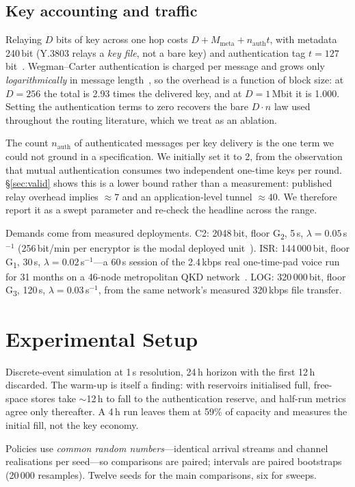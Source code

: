 \documentclass[conference]{IEEEtran}
\newcommand{\GI}{G\textsubscript{1}}
\newcommand{\GII}{G\textsubscript{2}}
\newcommand{\GIII}{G\textsubscript{3}}
\begin{document}
\subsection{Key accounting and traffic}\label{sec:acct}
Relaying $D$ bits of key across one hop costs
$D+M_{\mathrm{meta}}+n_{\mathrm{auth}}t$, with metadata 240\,bit (Y.3803 relays a
\emph{key file}, not a bare key) and authentication tag $t=127$\,bit~\cite{walenta}.
Wegman--Carter authentication is charged per message and grows only
\emph{logarithmically} in message length~\cite{fung}, so the overhead is a
function of block size: at $D=256$ the total is 2.93 times the delivered key, and
at $D=1$\,Mbit it is 1.000. Setting the authentication terms to zero recovers the
bare $D{\cdot}n$ law used throughout the routing literature, which we treat as an
ablation.

The count $n_{\mathrm{auth}}$ of authenticated messages per key delivery is the
one term we could not ground in a specification. We initially set it to 2, from
the observation that mutual authentication consumes two independent one-time keys
per round. \S\ref{sec:valid} shows this is a lower bound rather than a
measurement: published relay overhead implies $\approx7$ and an application-level
tunnel $\approx40$. We therefore report it as a swept parameter and re-check the
headline across the range.

Demands come from measured deployments. C2: 2048\,bit, floor \GII, 5\,s,
$\lambda=0.05$\,s$^{-1}$ (256\,bit/min per encryptor is the modal deployed
unit~\cite{stucki}). ISR: 144\,000\,bit, floor \GI, 30\,s,
$\lambda=0.02$\,s$^{-1}$---a 60\,s session of the 2.4\,kbps real one-time-pad
voice run for 31 months on a 46-node metropolitan QKD network~\cite{chen}. LOG:
320\,000\,bit, floor \GIII, 120\,s, $\lambda=0.03$\,s$^{-1}$, from the same
network's measured 320\,kbps file transfer.

\section{Experimental Setup}\label{sec:setup}
Discrete-event simulation at 1\,s resolution, 24\,h horizon with the first 12\,h
discarded. The warm-up is itself a finding: with reservoirs initialised full,
free-space stores take $\sim$12\,h to fall to the authentication reserve, and
half-run metrics agree only thereafter. A 4\,h run leaves them at 59\% of
capacity and measures the initial fill, not the key economy.

Policies use \emph{common random numbers}---identical arrival streams and channel
realisations per seed---so comparisons are paired; intervals are paired
bootstraps (20\,000 resamples). Twelve seeds for the main comparisons, six for
sweeps.
\end{document}
